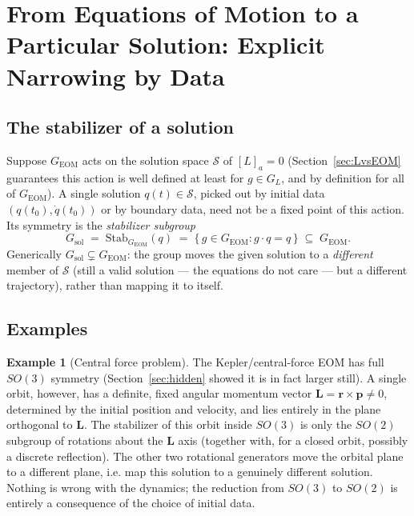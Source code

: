 \documentclass[11pt]{article}
\theoremstyle{definition}
\newtheorem{example}[theorem]{Example}
\theoremstyle{remark}
\newcommand{\GEOM}{G_{\mathrm{EOM}}}
\newcommand{\GL}{G_{L}}
\newcommand{\Stab}{\mathrm{Stab}}
\begin{document}
\section{From Equations of Motion to a Particular Solution: Explicit Narrowing by Data}
\label{sec:explicit}

\subsection{The stabilizer of a solution}

Suppose $\GEOM$ acts on the solution space $\mathcal S$ of $[L]_a=0$ (Section~\ref{sec:LvsEOM} guarantees this action is well defined at least for $g\in\GL$, and by definition for all of $\GEOM$). A single solution $q(t)\in\mathcal S$, picked out by initial data $(q(t_0),\dot q(t_0))$ or by boundary data, need not be a fixed point of this action. Its symmetry is the \emph{stabilizer subgroup}
\[
G_{\text{sol}} \;=\; \Stab_{\GEOM}(q) \;=\; \{\, g\in\GEOM : g\cdot q = q \,\} \;\subseteq\; \GEOM .
\]
Generically $G_{\text{sol}} \subsetneq \GEOM$: the group moves the given solution to a \emph{different} member of $\mathcal S$ (still a valid solution — the equations do not care — but a different trajectory), rather than mapping it to itself.

\subsection{Examples}

\begin{example}[Central force problem]
The Kepler/central-force EOM has full $SO(3)$ symmetry (Section~\ref{sec:hidden} showed it is in fact larger still). A single orbit, however, has a definite, fixed angular momentum vector $\bm L = \bm r\times\bm p\neq 0$, determined by the initial position and velocity, and lies entirely in the plane orthogonal to $\bm L$. The stabilizer of this orbit inside $SO(3)$ is only the $SO(2)$ subgroup of rotations about the $\bm L$ axis (together with, for a closed orbit, possibly a discrete reflection). The other two rotational generators move the orbital plane to a different plane, i.e. map this solution to a genuinely different solution. Nothing is wrong with the dynamics; the reduction from $SO(3)$ to $SO(2)$ is entirely a consequence of the choice of initial data.
\end{example}
\end{document}
